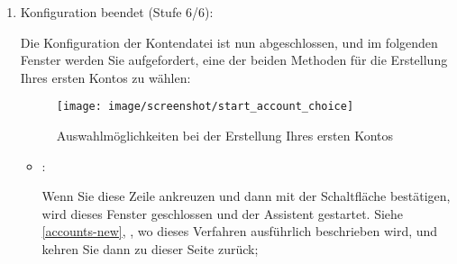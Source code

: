 \begin{enumerate}
	\item Konfiguration beendet (Stufe 6/6):\par%
	Die Konfiguration der Kontendatei ist nun abgeschlossen, und im folgenden Fenster werden Sie aufgefordert, eine der beiden Methoden für die Erstellung Ihres ersten Kontos zu wählen:%

\vspace{2mm}

\begin{figure}[htbp]
	\begin{center}
		\texttt{[image: image/screenshot/start\_account\_choice]}
	\end{center}
	\caption{Auswahlmöglichkeiten bei der Erstellung Ihres ersten Kontos}
	\label{start_account_choice}
\end{figure}

	\begin{itemize}
		\item[\textopenbullet] :\par%
		Wenn Sie diese Zeile ankreuzen und dann mit der Schaltfläche  bestätigen, wird dieses Fenster geschlossen und der Assistent  gestartet. Siehe \vref{accounts-new}, , wo dieses Verfahren ausführlich beschrieben wird, und kehren Sie dann zu dieser Seite zurück;%
	

\end{itemize}
\end{enumerate}
